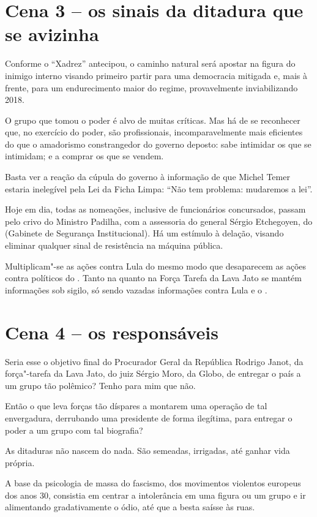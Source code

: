\section{Cena 3 -- os sinais da ditadura que se avizinha}

Conforme o ``Xadrez'' antecipou, o caminho natural será apostar na
figura do inimigo interno visando primeiro partir para uma democracia
mitigada e, mais à frente, para um endurecimento maior do regime,
provavelmente inviabilizando 2018.

O grupo que tomou o poder é alvo de muitas críticas. Mas há de se
reconhecer que, no exercício do poder, são profissionais,
incomparavelmente mais eficientes do que o amadorismo constrangedor do
governo deposto: sabe intimidar os que se intimidam; e a comprar os que
se vendem.

Basta ver a reação da cúpula do governo à informação de que Michel Temer
estaria inelegível pela Lei da Ficha Limpa: ``Não tem problema:
mudaremos a lei''.

Hoje em dia, todas as nomeações, inclusive de funcionários concursados,
passam pelo crivo do Ministro Padilha, com a assessoria do general
Sérgio Etchegoyen, do  (Gabinete de Segurança Institucional). Há um
estímulo à delação, visando eliminar qualquer sinal de resistência na
máquina pública.

Multiplicam"-se as ações contra Lula do mesmo modo que desaparecem as
ações contra políticos do . Tanto na  quanto na Força Tarefa da
Lava Jato se mantém informações sob sigilo, só sendo vazadas informações
contra Lula e o .

\section{Cena 4 -- os responsáveis}

Seria esse o objetivo final do Procurador Geral da República Rodrigo
Janot, da força"-tarefa da Lava Jato, do juiz Sérgio Moro, da Globo, de
entregar o país a um grupo tão polêmico? Tenho para mim que não.

Então o que leva forças tão díspares a montarem uma operação de tal
envergadura, derrubando uma presidente de forma ilegítima, para entregar
o poder a um grupo com tal biografia?

As ditaduras não nascem do nada. São semeadas, irrigadas, até ganhar
vida própria.

A base da psicologia de massa do fascismo, dos movimentos violentos
europeus dos anos 30, consistia em centrar a intolerância em uma figura
ou um grupo e ir alimentando gradativamente o ódio, até que a besta
saísse às ruas.

